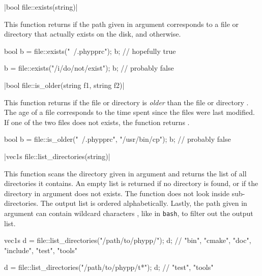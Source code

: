 \funcitem \vectorfunc \cppinline|bool file::exists(string)| 

This function returns \cpptrue if the path given in argument corresponds to a file or directory that actually exists on the disk, and \cppfalse otherwise.

\begin{example}
\begin{cppcode}
bool b = file::exists("~/.phypprc");
b; // hopefully true

b = file::exists("/i/do/not/exist");
b; // probably false
\end{cppcode}
\end{example}

\funcitem \cppinline|bool file::is_older(string f1, string f2)| 

This function returns \cpptrue if the file or directory  is \emph{older} than the file or directory . The age of a file corresponds to the time spent since the files were last modified. If one of the two files does not exists, the function returns \cppfalse.

\begin{example}
\begin{cppcode}
bool b = file::is_older("~/.phypprc", "/usr/bin/cp");
b; // probably false
\end{cppcode}
\end{example}

\funcitem \cppinline|vec1s file::list_directories(string)| 

This function scans the directory given in argument and returns the list of all directories it contains. An empty list is returned if no directory is found, or if the directory in argument does not exists. The function does not look inside sub-directories. The output list is ordered alphabetically. Lastly, the path given in argument can contain wildcard characters \cppinline{*}, like in \texttt{bash}, to filter out the output list.

\begin{example}
\begin{cppcode}
vec1s d = file::list_directories("/path/to/phypp/");
d; // {"bin", "cmake", "doc", "include", "test", "tools"}

d = file::list_directories("/path/to/phypp/t*");
d; // {"test", "tools"}
\end{cppcode}
\end{example}


